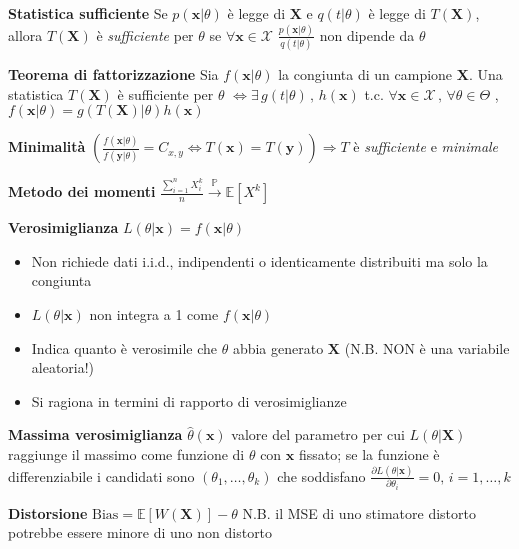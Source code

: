 \documentclass[openany]{book} %
\begin{document}
\textbf{Statistica sufficiente} Se $p(\boldsymbol{x}|\theta)$ è legge di $\boldsymbol{X}$ e $q(t|\theta)$ è legge di $T(\boldsymbol{X})$, allora $T(\boldsymbol{X})$ è \textit{sufficiente} per $\theta$ se $\forall \boldsymbol{x}\in \mathcal{X}$ $\frac{p(\boldsymbol{x}|\theta)}{q(t|\theta)}$ non dipende da $\theta$

\textbf{Teorema di fattorizzazione} Sia $f(\boldsymbol{x}|\theta)$ la congiunta di un campione $\boldsymbol{X}$. Una statistica $T(\boldsymbol{X})$ è sufficiente per $\theta$ $\Leftrightarrow \exists \,g(t|\theta)\,,\,h(\boldsymbol{x})$ t.c. $\forall \boldsymbol{x}\in \mathcal{X}\,,\,\forall \theta\in\Theta$ , $f(\boldsymbol{x}|\theta)=g(T(\boldsymbol{X})|\theta)h(\boldsymbol{x})$

\textbf{Minimalità} $(\frac{f(\boldsymbol{x}|\theta)}{f(\boldsymbol{y}|\theta)}=C_{x,y}\Leftrightarrow T(\boldsymbol{x})=T(\boldsymbol{y}))\Rightarrow T$ è \textit{sufficiente} e \textit{minimale}

\textbf{Metodo dei momenti} $\frac{\sum_{i=1}^nX_i^k}{n}\overset{\mathbb{P}}{\rightarrow}\mathbb{E}[X^k]$

\textbf{Verosimiglianza} $L(\theta|\boldsymbol{x})=f(\boldsymbol{x}|\theta)$

\begin{itemize}

	\item Non richiede dati i.i.d., indipendenti o identicamente distribuiti ma solo la congiunta

	\item $L(\theta|\boldsymbol{x})$ non integra a 1 come $f(\boldsymbol{x}|\theta)$

	\item Indica quanto è verosimile che $\theta$ abbia generato $\boldsymbol{X}$ (N.B. NON è una variabile aleatoria!)

	\item Si ragiona in termini di rapporto di verosimiglianze

\end{itemize}

\textbf{Massima verosimiglianza} $\hat\theta(\boldsymbol{x})$ valore del parametro per cui $L(\theta|\boldsymbol{X})$ raggiunge il massimo come funzione di $\theta$ con $\boldsymbol{x}$ fissato; se la funzione è differenziabile i candidati sono $(\theta_1,\dots,\theta_k)$ che soddisfano $\frac{\partial L(\theta|\boldsymbol{x})}{\partial\theta_i}=0,\,i=1,\dots,k$

\textbf{Distorsione} $\text{Bias}=\mathbb{E}[W(\boldsymbol{X})]-\theta$ N.B. il MSE di uno stimatore distorto potrebbe essere minore di uno non distorto
\end{document}

